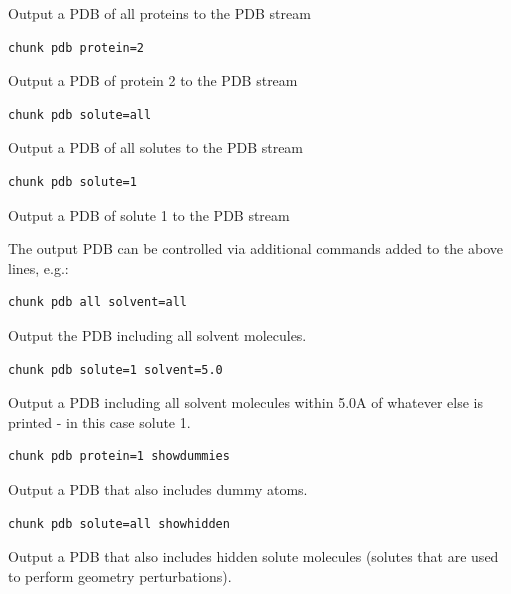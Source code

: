 \documentclass[letterpaper,10pt,english]{sphinxmanual}
\begin{document}
Output a PDB of all proteins to the PDB stream

\begin{Verbatim}[commandchars=\\\{\}]
chunk pdb protein=2
\end{Verbatim}

Output a PDB of protein 2 to the PDB stream

\begin{Verbatim}[commandchars=\\\{\}]
chunk pdb solute=all
\end{Verbatim}

Output a PDB of all solutes to the PDB stream

\begin{Verbatim}[commandchars=\\\{\}]
chunk pdb solute=1
\end{Verbatim}

Output a PDB of solute 1 to the PDB stream

The output PDB can be controlled via additional commands added to the above lines, e.g.:

\begin{Verbatim}[commandchars=\\\{\}]
chunk pdb all solvent=all
\end{Verbatim}

Output the PDB including all solvent molecules.

\begin{Verbatim}[commandchars=\\\{\}]
chunk pdb solute=1 solvent=5.0
\end{Verbatim}

Output a PDB including all solvent molecules within 5.0A of whatever else is printed - in this case solute 1.

\begin{Verbatim}[commandchars=\\\{\}]
chunk pdb protein=1 showdummies
\end{Verbatim}

Output a PDB that also includes dummy atoms.

\begin{Verbatim}[commandchars=\\\{\}]
chunk pdb solute=all showhidden
\end{Verbatim}

Output a PDB that also includes hidden solute molecules (solutes that are used to perform geometry perturbations).
\end{document}
